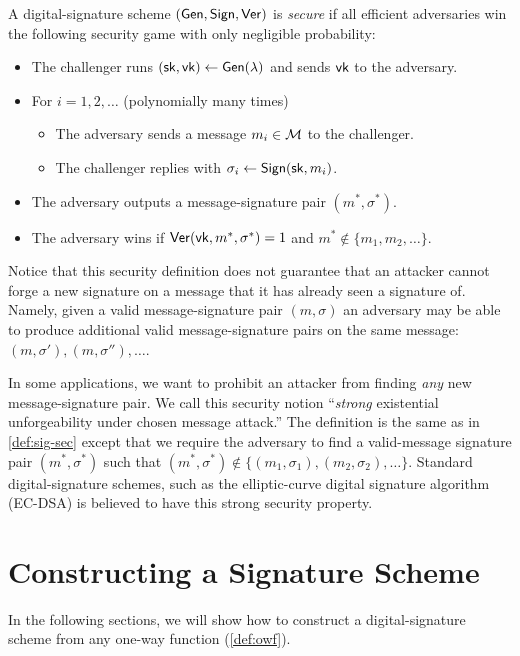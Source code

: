 \begin{definition}\label{def:sig-sec}
  A digital-signature scheme $(\mathsf{Gen}, \mathsf{Sign}, \mathsf{Ver})$ is \emph{secure} if
  all efficient adversaries win the following security 
  game with only negligible probability:
  \begin{itemize}[noitemsep]
    \item The challenger runs $({\mathsf{sk}}, \mathsf{vk}) \gets \mathsf{Gen}(\lambda)$ and sends $\mathsf{vk}$ to the adversary.
    \item For $i = 1, 2, \dots$  (polynomially many times)
      \begin{itemize}
        \item The adversary sends a message $m_i \in \mathcal{M}$ to the challenger.
        \item The challenger replies with $\sigma_i \gets \mathsf{Sign}({\mathsf{sk}}, m_i)$.
      \end{itemize}
    \item The adversary outputs a message-signature pair $(m^*, \sigma^*)$.
    \item The adversary wins if $\mathsf{Ver}(\mathsf{vk}, m^*, \sigma^*) = 1$ and $m^* \not \in \{m_1, m_2, \dots\}$.
  \end{itemize}
\end{definition}

Notice that this   security definition does not guarantee that an attacker cannot forge a new signature on a message that it has already seen a signature of. 
Namely, given a valid
message-signature pair $(m, \sigma)$ an adversary may be able to produce additional valid message-signature
pairs on the same message: $(m, \sigma'), (m, \sigma''), \dots$.

In some applications, we want to prohibit an attacker from finding \emph{any}
new message-signature pair. We call this security notion ``\emph{strong} existential unforgeability under chosen message attack.''  
The definition is the same as in \cref{def:sig-sec} except that we require
the adversary to find a valid-message signature pair $(m^*, \sigma^*)$
such that $(m^*, \sigma^*) \not \in \{ (m_1, \sigma_1), (m_2, \sigma_2), \dots \}$.  Standard digital-signature schemes, such as the elliptic-curve digital signature
algorithm (EC-DSA) is believed to have this strong security property.

\section{Constructing a Signature Scheme}
In the following sections, we will show how to construct a digital-signature
scheme from any one-way function (\cref{def:owf}).

